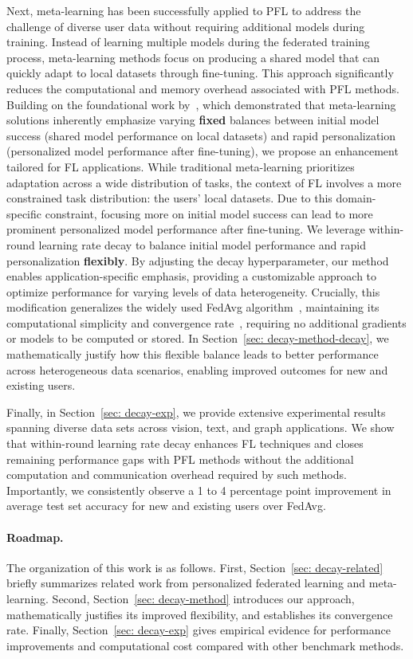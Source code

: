 Next, meta-learning has been successfully applied to PFL to address the challenge of diverse user data without requiring additional models during training.
Instead of learning multiple models during the federated training process, meta-learning methods focus on producing a shared model that can quickly adapt to local datasets through fine-tuning.
This approach significantly reduces the computational and memory overhead associated with PFL methods.
Building on the foundational work by~\citet{reptile}, which demonstrated that meta-learning solutions inherently emphasize varying \textbf{fixed} balances between initial model success (shared model performance on local datasets) and rapid personalization (personalized model performance after fine-tuning), we propose an enhancement tailored for FL applications.
While traditional meta-learning prioritizes adaptation across a wide distribution of tasks, the context of FL involves a more constrained task distribution: the users' local datasets. 
Due to this domain-specific constraint, focusing more on initial model success can lead to more prominent personalized model performance after fine-tuning. 
We leverage within-round learning rate decay to balance initial model performance and rapid personalization \textbf{flexibly}. 
By adjusting the decay hyperparameter, our method enables application-specific emphasis, providing a customizable approach to optimize performance for varying levels of data heterogeneity.
Crucially, this modification generalizes the widely used FedAvg algorithm~\citep{fedavg}, maintaining its computational simplicity and convergence rate~\citep{fedavg-conv}, requiring no additional gradients or models to be computed or stored.
In Section~\ref{sec: decay-method-decay}, we mathematically justify how this flexible balance leads to better performance across heterogeneous data scenarios, enabling improved outcomes for new and existing users.

Finally, in Section~\ref{sec: decay-exp}, we provide extensive experimental results spanning diverse data sets across vision, text, and graph applications. 
We show that within-round learning rate decay enhances FL techniques and closes remaining performance gaps with PFL methods without the additional computation and communication overhead required by such methods.
Importantly, we consistently observe a 1 to 4 percentage point improvement in average test set accuracy for new and existing users over FedAvg.

\paragraph{Roadmap.}
The organization of this work is as follows.
First, Section~\ref{sec: decay-related} briefly summarizes related work from personalized federated learning and meta-learning.
Second, Section~\ref{sec: decay-method} introduces our approach, mathematically justifies its improved flexibility, and establishes its convergence rate.
Finally, Section~\ref{sec: decay-exp} gives empirical evidence for performance improvements and computational cost compared with other benchmark methods.

